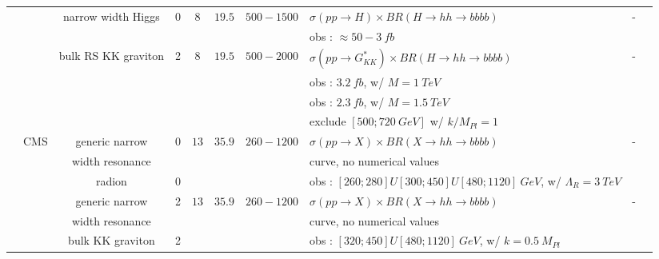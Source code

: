 \begin{table}[h!]
{\begin{tabular}{|l|l|c|c|c|c|c|l|c|c|}
                    &        &narrow width Higgs        &0    &$8$        &$19.5$        &$500-1500$        &$\sigma(pp\rightarrow H)\times BR(H\rightarrow hh\rightarrow bbbb)$             &-    &\cite{Aad:2015uka}\\
                    &        &                &    &        &        &            &obs : $\approx 50-3\ fb$                                &    &\\
\cline{3-10}
                    &        &bulk RS KK graviton        &2    &$8$        &$19.5$        &$500-2000$        &$\sigma(pp\rightarrow G^*_{KK})\times BR(H\rightarrow hh\rightarrow bbbb)$         &-    &\cite{Aad:2015uka}\\
                    &        &                &    &        &        &            &obs : $3.2\ fb$, w/ $M=1\ TeV$                                &    &\\
                    &        &                &    &        &        &            &obs : $2.3\ fb$, w/ $M=1.5\ TeV$                            &    &\\
                    &        &                &    &        &        &            &exclude $[500 ; 720\ GeV]$ w/ $k/M_{Pl}=1$                        &    &\\
\cline{2-10}
                    &CMS        &generic narrow            &0    &$13$        &$35.9$        &$260-1200$        &$\sigma(pp\rightarrow X)\times BR(X\rightarrow hh\rightarrow bbbb)$             &-    &\cite{Sirunyan:2018zkk}\\
                    &        &width resonance        &    &        &        &            &curve, no numerical values                                &    &\\
                    &        &radion                &0    &        &        &            &obs : $[260 ; 280] U [300 ; 450] U [480 ; 1120]\ GeV$, w/ $\Lambda_R=3\ TeV$        &    &\\
\cline{3-10}
                    &        &generic narrow            &2    &$13$        &$35.9$        &$260-1200$        &$\sigma(pp\rightarrow X)\times BR(X\rightarrow hh\rightarrow bbbb)$             &-    &\cite{Sirunyan:2018zkk}\\
                    &        &width resonance        &    &        &        &            &curve, no numerical values                                &    &\\
                    &        &bulk KK graviton        &2    &        &        &            &obs : $[320 ; 450] U [480 ; 1120]\ GeV$, w/ $k=0.5\ M_{Pl}$                        &    &\\

\end{tabular}}
\end{table}
